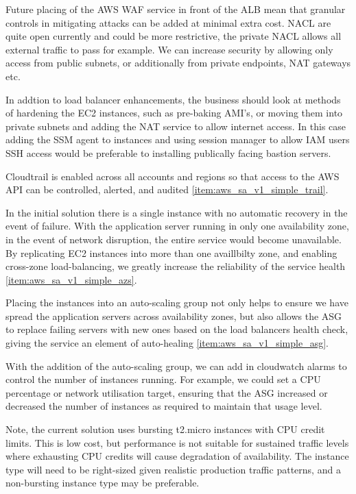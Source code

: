 Future placing of the AWS WAF service in front of the ALB mean that granular controls in mitigating attacks can be added at minimal extra cost. NACL are quite open currently and could be more restrictive, the private NACL allows all external traffic to pass for example. We can increase security by allowing only access from public subnets, or additionally from private endpoints, NAT gateways etc. 

In addtion to load balancer enhancements, the business should look at methods of hardening the EC2 instances, such as pre-baking AMI's, or moving them into private subnets and adding the NAT service to allow internet access. In this case adding the SSM agent to instances and using session manager to allow IAM users SSH access would be preferable to installing publically facing bastion servers.

Cloudtrail is enabled across all accounts and regions so that access to the AWS API can be controlled, alerted, and audited \ref{item:aws_sa_v1_simple_trail}.


In the initial solution there is a single instance with no automatic recovery in the event of failure. With the application server running in only one availability zone, in the event of network disruption, the entire service would become unavailable. By replicating EC2 instances into more than one availlbilty zone, and enabling cross-zone load-balancing, we greatly increase the reliability of the service health \ref{item:aws_sa_v1_simple_azs}.

Placing the instances into an auto-scaling group not only helps to ensure we have spread the application servers across availability zones, but also allows the ASG to replace failing servers with new ones based on the load balancers health check, giving the service an element of auto-healing \ref{item:aws_sa_v1_simple_asg}.


With the addition of the auto-scaling group, we can add in cloudwatch alarms to control the number of instances running. For example, we could set a CPU percentage or network utilisation target, ensuring that the ASG increased or decreased the number of instances as required to maintain that usage level.

Note, the current solution uses bursting t2.micro instances with CPU credit limits. This is low cost, but performance is not suitable for sustained traffic levels where exhausting CPU credits will cause degradation of availability. The instance type will need to be right-sized given realistic production traffic patterns, and a non-bursting instance type may be preferable.

